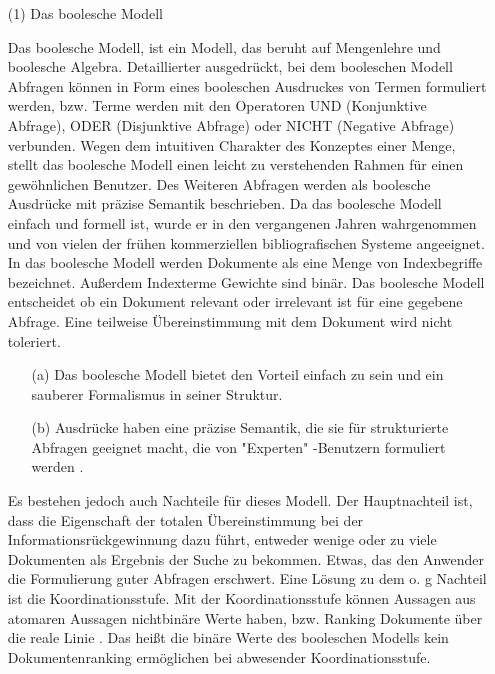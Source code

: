  \begin{itemize}
 	\item[(1)]Das boolesche Modell 
 
Das boolesche Modell, ist ein Modell, das beruht auf Mengenlehre und boolesche Algebra. Detaillierter ausgedrückt, bei dem booleschen Modell Abfragen können in Form eines booleschen Ausdruckes von Termen formuliert werden, bzw. Terme werden mit den Operatoren UND (Konjunktive Abfrage), ODER (Disjunktive Abfrage) oder NICHT (Negative Abfrage) verbunden. Wegen dem intuitiven Charakter des Konzeptes einer Menge, stellt das boolesche Modell einen leicht zu verstehenden Rahmen für einen gewöhnlichen Benutzer. Des Weiteren Abfragen werden als boolesche Ausdrücke mit präzise Semantik beschrieben. Da das boolesche Modell einfach und formell ist, wurde er in den vergangenen Jahren wahrgenommen und von vielen der frühen kommerziellen bibliografischen Systeme angeeignet. In das boolesche Modell werden Dokumente als eine Menge von Indexbegriffe bezeichnet. Außerdem Indexterme Gewichte sind binär. Das boolesche Modell entscheidet ob ein Dokument relevant oder irrelevant ist für eine gegebene Abfrage. Eine teilweise Übereinstimmung mit dem Dokument wird nicht toleriert. 

\begin{itemize}
	\item[(a)]Das boolesche Modell bietet den Vorteil einfach zu sein und ein sauberer Formalismus in seiner Struktur.
\end{itemize}	
	
	\begin{itemize}
		\item[(b)]Ausdrücke haben eine präzise Semantik, die sie für strukturierte Abfragen geeignet macht, die von "Experten" -Benutzern formuliert werden \cite{CBB13}.
\end{itemize}
	
Es bestehen jedoch auch Nachteile für dieses Modell. Der Hauptnachteil ist, dass die Eigenschaft der totalen Übereinstimmung bei der Informationsrückgewinnung dazu führt, entweder wenige oder zu viele Dokumenten als Ergebnis der Suche zu bekommen. Etwas, das den Anwender die Formulierung guter Abfragen erschwert. Eine Lösung zu dem o. g Nachteil ist die Koordinationsstufe. Mit der Koordinationsstufe können Aussagen aus atomaren Aussagen nichtbinäre Werte haben, bzw. Ranking Dokumente über die reale Linie \cite{MEL15}. Das heißt die binäre Werte des booleschen Modells kein Dokumentenranking ermöglichen bei abwesender Koordinationsstufe.


\end{itemize}
